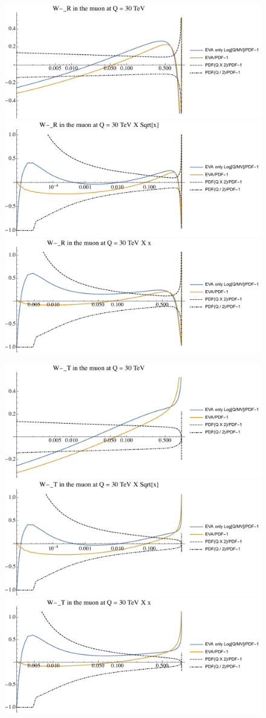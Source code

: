 \documentclass[a4paper,11pt]{article}
\begin{document}
\begin{figure}[ht]
\includegraphics[width=0.46\linewidth]{Notebooks/PlotPDFs/ratios/30TeV/W-_R_Q.pdf}
\includegraphics[width=0.46\linewidth]{Notebooks/PlotPDFs/ratios/30TeV/W-_R_Qsqrtx.pdf}
\includegraphics[width=0.46\linewidth]{Notebooks/PlotPDFs/ratios/30TeV/W-_R_Qx.pdf}
\end{figure}


\begin{figure}[ht]
\includegraphics[width=0.46\linewidth]{Notebooks/PlotPDFs/ratios/30TeV/W-_T_Q.pdf}
\includegraphics[width=0.46\linewidth]{Notebooks/PlotPDFs/ratios/30TeV/W-_T_Qsqrtx.pdf}
\includegraphics[width=0.46\linewidth]{Notebooks/PlotPDFs/ratios/30TeV/W-_T_Qx.pdf}
\end{figure}
\end{document}
